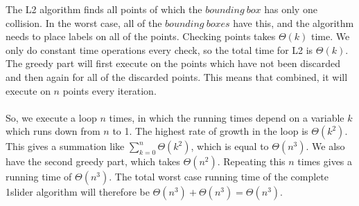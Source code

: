 \documentclass[crop=false,a4paper,oneside,11pt]{article}
\begin{document}
The L2 algorithm finds all points of which the $bounding \ box$ has only one collision. In the worst case, all of the $bounding \ boxes$ have this, and the algorithm needs to place labels on all of the points. Checking points takes $\Theta(k)$ time. We only do constant time operations every check, so the total time for L2 is $\Theta(k)$. \\
The greedy part will first execute on the points which have not been discarded and then again for all of the discarded points. This means that combined, it will execute on $n$ points every iteration.  
\\ \\
So, we execute a loop $n$ times, in which the running times depend on a variable $k$ which runs down from $n$ to 1. The highest rate of growth in the loop is $\Theta(k^2)$. This gives a summation like $\sum_{k=0}^n \Theta(k^2)$, which is equal to $\Theta(n^3)$. We also have the second greedy part, which takes $\Theta(n^2)$. Repeating this $n$ times gives a running time of $\Theta(n^3)$.
The total worst case running time of the complete 1slider algorithm will therefore be $\Theta(n^3) + \Theta(n^3) = \Theta(n^3)$.
\end{document}
